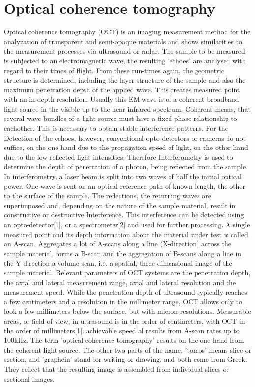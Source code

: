 \section{Optical coherence tomography}
Optical coherence tomography (OCT) is an imaging measurement method for the analyzation of transparent and semi-opaque materials and shows similarities to the measurement processes via ultrasound or radar. The sample to be measured is subjected to an electromagnetic wave, the resulting 'echoes' are analysed with regard to their times of flight. From these run-times again,  the geometric structure is determined, including the layer structure of the sample and also the maximum penetration depth of the applied wave. This creates measured point with an in-depth resolution. Usually this EM wave is of a coherent broadband light source in the visible  up to the near infrared spectrum. Coherent means, that several wave-bundles of a light source must have a fixed phase relationship to eachother. This is necessary to obtain stable interference patterns.  For the Detection of the echoes, however, conventional opto-detectors or cameras do not suffice, on the one hand due to the propagation speed of light, on the other hand due to the low reflected light intensities. Therefore Interferometry is used to determine the depth of penetration of a photon, being reflected from the sample. In interferometry, a laser beam is split into two waves of half the initial optical power. One wave is sent on an optical reference path of known length, the other to the surface of the sample. The reflections, the returning waves are superimposed and, depending on the nature of the sample material, result in constructive or destructive Interference. This interference can be detected using an opto-detector[1], or a spectrometer[2] and used for further processing. A single measured point and its depth information about the material under test is called an A-scan. Aggregates a lot of A-scans along a line (X-direction) across the sample material, forms a B-scan and the aggregation of B-scans along a line in the Y direction a volume scan, i.e. a spatial, three-dimensional image of the sample material. Relevant parameters of OCT systems are the penetration depth, the axial and lateral measurement range, axial and lateral resolution and the measurement speed. While the penetration depth of ultrasound typically reaches a few centimeters and a resolution in the millimeter range, OCT allows only to look a few millimeters below the surface, but with micron resolutions. Measurable areas, or field-of-view, in ultrasound is in the order of centimeters, with OCT in the order of millimeters[1]. achievable speed al results from A-scan rates up to 100kHz. The term 'optical coherence tomography' results on the one hand from the coherent light source. The other two parts of the name, 'tomos' means slice or section, and 'graphein' stand for writing or drawing, and both come from Greek. They reflect that the resulting image is assembled from individual slices or sectional images. 
